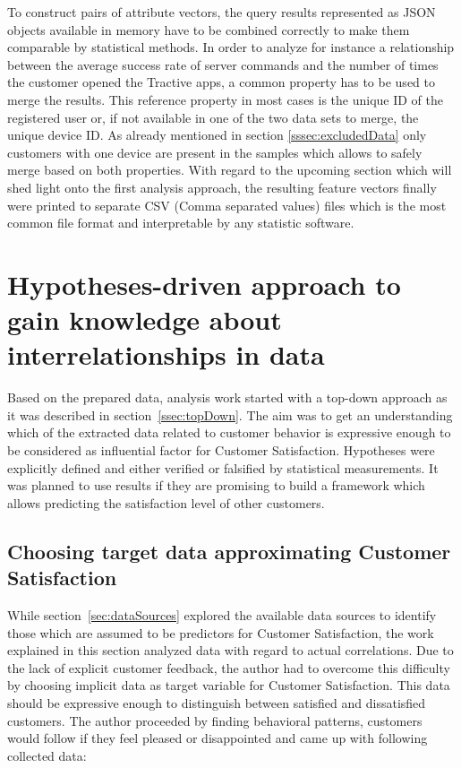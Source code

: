 To construct pairs of attribute vectors, the query results represented as JSON objects available in memory have to be combined correctly to make them comparable by statistical methods. In order to analyze for instance a relationship between the average success rate of server commands and the number of times the customer opened the Tractive apps, a common property has to be used to merge the results. This reference property in most cases is the unique ID of the registered user or, if not available in one of the two data sets to merge, the unique device ID. As already mentioned in section \ref{sssec:excludedData} only customers with one device are present in the samples which allows to safely merge based on both properties. With regard to the upcoming section which will shed light onto the first analysis approach, the resulting feature vectors finally were printed to separate CSV (Comma separated values) files which is the most common file format and interpretable by any statistic software.

\section{Hypotheses-driven approach to gain knowledge about interrelationships in data}
\label{sec:hypothesesDriven}
Based on the prepared data, analysis work started with a top-down approach as it was described in section~\ref{ssec:topDown}. The aim was to get an understanding which of the extracted data related to customer behavior is expressive enough to be considered as influential factor for Customer Satisfaction. Hypotheses were explicitly defined and either verified or falsified by statistical measurements. It was planned to use results if they are promising to build a framework which allows predicting the satisfaction level of other customers. 

\subsection{Choosing target data approximating Customer Satisfaction}
While section~\ref{sec:dataSources} explored the available data sources to identify those which are assumed to be predictors for Customer Satisfaction, the work explained in this section analyzed data with regard to actual correlations. Due to the lack of explicit customer feedback, the author had to overcome this difficulty by choosing implicit data as target variable for Customer Satisfaction. This data should be expressive enough to distinguish between satisfied and dissatisfied customers. The author proceeded by finding behavioral patterns, customers would follow if they feel pleased or disappointed and came up with following collected data:

